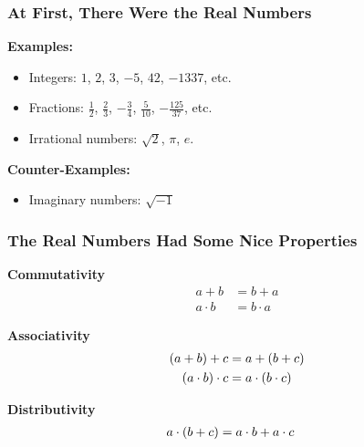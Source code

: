 \begin{frame}

\frametitle{At First, There Were the Real Numbers}

\vspace{\fill}

\textbf{Examples:}

\begin{itemize}

\item Integers: $1$, $2$, $3$, $-5$, $42$, $-1337$, etc.

\item Fractions: $\frac{1}{2}$, $\frac{2}{3}$, $-\frac{3}{4}$, $\frac{5}{10}$,
$-\frac{125}{37}$, etc.

\item Irrational numbers: $\sqrt{2}$, $\pi$, $e$.

\end{itemize}

\textbf{Counter-Examples:}

\begin{itemize}

\item Imaginary numbers: $\sqrt{-1}$

\end{itemize}

\end{frame}

\begin{frame}

\frametitle{The Real Numbers Had Some Nice Properties}

\vspace{\fill}

\begin{center}

\begin{minipage}{0.5\textwidth}
\begin{center}
\textbf{Commutativity} \begin{align*}
a + b &= b + a \\
a \cdot b &= b \cdot a
\end{align*}
\end{center}
\end{minipage}%
\begin{minipage}{0.5\textwidth}
\begin{center}
\textbf{Associativity} \begin{align*}
 \mathopen{}\left(a + b\right)\mathclose{}  + c &= a +  \mathopen{}\left(b + c\right)\mathclose{}  \\
 \mathopen{}\left(a \cdot b\right)\mathclose{}  \cdot c &= a \cdot  \mathopen{}\left(b \cdot c\right)\mathclose{} 
\end{align*}
\end{center}
\end{minipage}

\vspace{\fill}

\textbf{Distributivity} \begin{align*}
a \cdot  \mathopen{}\left(b + c\right)\mathclose{}  &= a \cdot b + a \cdot c
\end{align*}

\end{center}

\vspace{\fill}

\end{frame}
